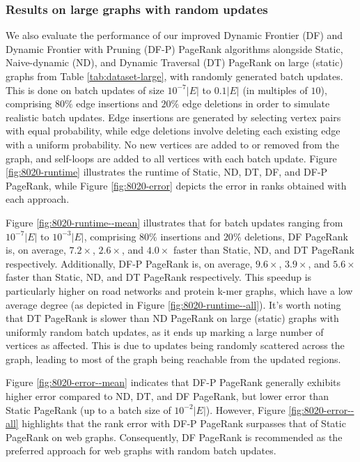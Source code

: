 \subsubsection{Results on large graphs with random updates}

We also evaluate the performance of our improved Dynamic Frontier (DF) and Dynamic Frontier with Pruning (DF-P) PageRank algorithms alongside Static, Naive-dynamic (ND), and Dynamic Traversal (DT) PageRank on large (static) graphs from Table \ref{tab:dataset-large}, with randomly generated batch updates. This is done on batch updates of size $10^{-7}|E|$ to $0.1|E|$ (in multiples of $10$), comprising $80\%$ edge insertions and $20\%$ edge deletions in order to simulate realistic batch updates. Edge insertions are generated by selecting vertex pairs with equal probability, while edge deletions involve deleting each existing edge with a uniform probability. No new vertices are added to or removed from the graph, and self-loops are added to all vertices with each batch update. Figure \ref{fig:8020-runtime} illustrates the runtime of Static, ND, DT, DF, and DF-P PageRank, while Figure \ref{fig:8020-error} depicts the error in ranks obtained with each approach.

Figure \ref{fig:8020-runtime--mean} illustrates that for batch updates ranging from $10^{-7}|E|$ to $10^{-3}|E|$, comprising $80\%$ insertions and $20\%$ deletions, DF PageRank is, on average, $7.2\times$, $2.6\times$, and $4.0\times$ faster than Static, ND, and DT PageRank respectively. Additionally, DF-P PageRank is, on average, $9.6\times$, $3.9\times$, and $5.6\times$ faster than Static, ND, and DT PageRank respectively. This speedup is particularly higher on road networks and protein k-mer graphs, which have a low average degree (as depicted in Figure \ref{fig:8020-runtime--all}). It's worth noting that DT PageRank is slower than ND PageRank \cite{sahu2024incrementally} on large (static) graphs with uniformly random batch updates, as it ends up marking a large number of vertices as affected. This is due to updates being randomly scattered across the graph, leading to most of the graph being reachable from the updated regions.

Figure \ref{fig:8020-error--mean} indicates that DF-P PageRank generally exhibits higher error compared to ND, DT, and DF PageRank, but lower error than Static PageRank (up to a batch size of $10^{-2}|E|$). However, Figure \ref{fig:8020-error--all} highlights that the rank error with DF-P PageRank surpasses that of Static PageRank on web graphs. Consequently, DF PageRank is recommended as the preferred approach for web graphs with random batch updates.


